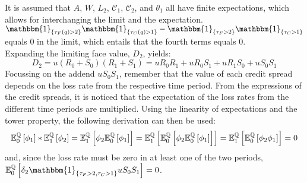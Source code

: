 \documentclass[main.tex]{subfiles}
\begin{document}
        It is assumed that $A$, $W$, $L_{2}$, $\mathcal{C}_1$, $\mathcal{C}_2$, and $\theta_1$ all have finite expectations,
        which allows for interchanging the limit and the expectation.
        $\mathbbm{1}_{\{\tau_{F}(q)>2\}} \mathbbm{1}_{\{\tau_{C}(q)>1\}} - \mathbbm{1}_{\{\tau_{F}>2\}} \mathbbm{1}_{\{\tau_{C}>1\}}$ equals 0 in the limit,
        which entails that the fourth terms equals 0.
        \\
        Expanding the limiting face value, $D_{2}$, yields:
        \begin{equation}
            D_2 = u(R_0 + S_0)(R_1 + S_1) = u R_0 R_1 + u R_0 S_1 + u R_1 S_0 + u S_0 S_1
        \end{equation}
        Focussing on the addend $u S_0 S_1$, remember that the value of each credit spread depends on the loss rate from the respective time period.
        From the expressions of the credit spreads, it is noticed that the expectation of the loss rates from the different time periods are multiplied.
        Using the linearity of expectations and the tower property, the following derivation can then be used:
        \begin{equation*}
            \mathbb{E}_{0}^{\mathbb{Q}}\left[\phi_1\right]
            * \mathbb{E}_{1}^{\mathbb{Q}}\left[\phi_2\right]
            = \mathbb{E}_{1}^{\mathbb{Q}}\left[
                \phi_2 \mathbb{E}_{0}^{\mathbb{Q}}\left[\phi_1\right]
            \right] 
            = \mathbb{E}_{1}^{\mathbb{Q}}\left[
                \mathbb{E}_{0}^{\mathbb{Q}}\left[
                    \phi_2
                    \mathbb{E}_{0}^{\mathbb{Q}}\left[
                        \phi_1
                    \right]
                \right]
            \right]
            = \mathbb{E}_{1}^{\mathbb{Q}}\left[
                \mathbb{E}_{0}^{\mathbb{Q}}\left[
                    \phi_2 \phi_1
                \right]
            \right]
            = 0
        \end{equation*}
        and, since the loss rate must be zero in at least one of the two periods,
        $\mathbb{E}_{0}^{\rnmeasure}\left[\delta_2\mathbbm{1}_{\{\tau_{F}>2,\tau_{C}>1\}}u S_0 S_1\right] = 0$.
        
\end{document}
